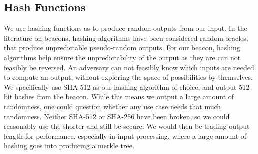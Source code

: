 \subsection{Hash Functions}
We use hashing functions as to produce random outputs from our input. In the literature on beacons, hashing algorithms have been considered random oracles, that produce unpredictable pseudo-random outputs.
For our beacon, hashing algorithms help ensure the unpredictability of the output as they are can not feasibly be reversed. An adversary can not feasibly know which inputs are needed to compute an output, without exploring the space of possibilities by themselves.
We specifically use SHA-512 as our hashing algorithm of choice, and output 512-bit hashes from the beacon. While this means we output a large amount of randomness, one could question whether any use case needs that much randomness. Neither SHA-512 or SHA-256 have been broken, so we could reasonably use the shorter and still be secure. We would then be trading output length for performance, especially in input processing, where a large amount of hashing goes into producing a merkle tree.